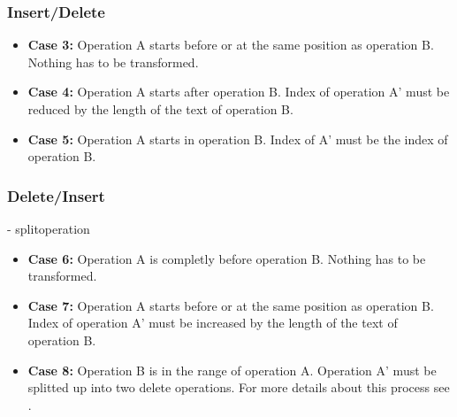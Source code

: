 \subsubsection{Insert/Delete}
\begin{itemize}
\item \textbf{Case 3:}
Operation A starts before or at the same position as operation B. Nothing has to be transformed.
\item \textbf{Case 4:}
Operation A starts after operation B. Index of operation A' must be reduced by the length of the text of operation B.
\item \textbf{Case 5:}
Operation A starts in operation B. Index of A' must be the index of operation B.
\end{itemize}

\subsubsection{Delete/Insert}
\label{Delete_Insert}
- splitoperation
\begin{itemize}
\item \textbf{Case 6:}
Operation A is completly before operation B. Nothing has to be transformed.
\item \textbf{Case 7:}
Operation A starts before or at the same position as operation B. Index of operation A' must be increased by the length of the text of operation B.
\item \textbf{Case 8:}
Operation B is in the range of operation A. Operation A' must be splitted up into two delete operations. For more details about this process see \cite{Delete_Insert}.
\end{itemize}

